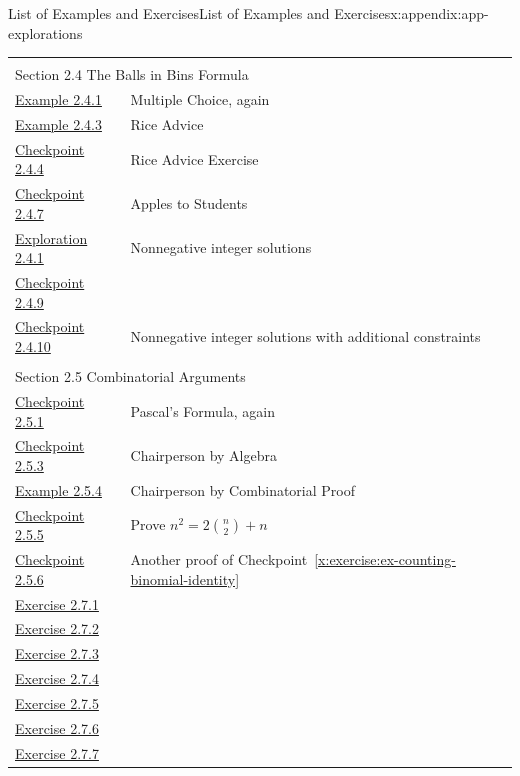 \documentclass[oneside,10pt,]{book}
\newcommand{\xreffont}{\relax}
\numberwithin{equation}{section}
\begin{document}
\begin{appendixptx}{List of Examples and Exercises}{}{List of Examples and Exercises}{}{}{x:appendix:app-explorations}
\begin{longtable}[l]{ll}
\multicolumn{2}{l}{\null}\\[1.5ex] \multicolumn{2}{l}{\large Section 2.4 The Balls in Bins Formula}\\[0.5ex]
\hyperref[x:example:eg-counting-mcq-again]{Example 2.4.1}& Multiple Choice, again\\
\hyperref[x:example:eg-counting-rice]{Example 2.4.3}& Rice Advice\\
\hyperref[x:exercise:ex-counting-rice-1]{Checkpoint 2.4.4}& Rice Advice Exercise\\
\hyperref[x:exercise:ex-counting-apples]{Checkpoint 2.4.7}& Apples to Students\\
\hyperref[x:exploration:eg-counting-nonnegative]{Exploration 2.4.1}& Nonnegative integer solutions\\
\hyperref[x:exercise:ex-counting-nonnegative-1]{Checkpoint 2.4.9}& \\
\hyperref[x:exercise:ex-counting-nonnegative-2]{Checkpoint 2.4.10}& Nonnegative integer solutions with additional constraints\\
\multicolumn{2}{l}{\null}\\[1.5ex] \multicolumn{2}{l}{\large Section 2.5 Combinatorial Arguments}\\[0.5ex]
\hyperref[x:exercise:ex-counting-pascal-algebra]{Checkpoint 2.5.1}& Pascal's Formula, again\\
\hyperref[x:exercise:ex-chairperson-algebra]{Checkpoint 2.5.3}& Chairperson by Algebra\\
\hyperref[x:example:ex-chairperson-comb]{Example 2.5.4}& Chairperson by Combinatorial Proof\\
\hyperref[x:exercise:ex-counting-comb-proof-1]{Checkpoint 2.5.5}& Prove \(n^2 = 2\binom{n}{2} + n\)\\
\hyperref[x:exercise:ex-counting-comb-proof-2]{Checkpoint 2.5.6}& Another proof of Checkpoint~{\xreffont\ref*{x:exercise:ex-counting-binomial-identity}}\\
\hyperlink{g:exercise:id475440}{Exercise 2.7.1}& \\
\hyperlink{g:exercise:id475470}{Exercise 2.7.2}& \\
\hyperlink{g:exercise:id475491}{Exercise 2.7.3}& \\
\hyperlink{g:exercise:id475506}{Exercise 2.7.4}& \\
\hyperlink{g:exercise:id475564}{Exercise 2.7.5}& \\
\hyperlink{g:exercise:id475542}{Exercise 2.7.6}& \\
\hyperlink{g:exercise:id475578}{Exercise 2.7.7}& \\

\end{longtable}
\end{appendixptx}
\end{document}
